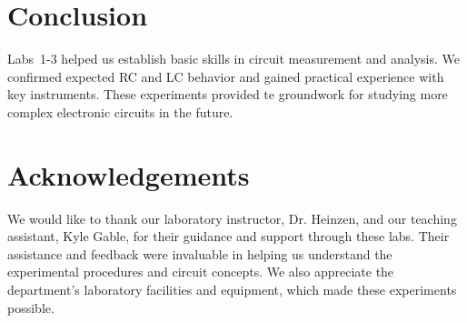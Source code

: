 \documentclass{article}
\begin{document}
\section*{Conclusion}

Labs~1-3 helped us establish basic skills in circuit measurement and analysis.
We confirmed expected RC and LC behavior and gained practical experience with
key instruments. These experiments provided te groundwork for studying more
complex electronic circuits in the future.

\section*{Acknowledgements}

We would like to thank our laboratory instructor, Dr. Heinzen, and our teaching 
assistant, Kyle Gable, for their guidance and support through these labs. Their 
assistance and feedback were invaluable in helping us understand the experimental 
procedures and circuit concepts. We also appreciate the department's laboratory 
facilities and equipment, which made these experiments possible.
\end{document}
